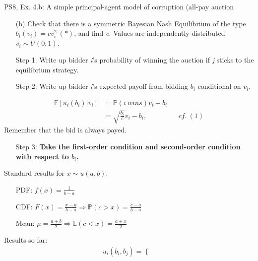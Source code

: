 \begin{frame}{PS8, Ex. 4.b: A simple principal-agent model of corruption (all-pay auction}
    \begin{itemize}
      \item[(b)] Check that there is a symmetric Bayesian Nash Equilibrium of the type $b_i(v_i) = cv_i^2\ (*)$, and find \textit{c}. Values are independently distributed $v_i\sim U(0, 1)$.
    \end{itemize} \vspace{-8pt}
    \begin{multicols}{2}
      \begin{itemize}
        \item[Step 1:] Write up bidder \textit{i}'s probability of winning the auction if \textit{j} sticks to the equilibrium strategy.
        \item[Step 2:] Write up bidder \textit{i}'s expected payoff from bidding $b_i$ conditional on $v_i$.
      \end{itemize} \vspace{-8pt}
      \begin{align*}
        \mathbb{E}[u_i(b_i)|v_i]&=\mathbb{P}(i\ wins)v_i-b_i\\
                           &=\sqrt{\frac{b_i}{c}}v_i-b_i,&&cf.\ (1)
      \end{align*} \vspace{-8pt}
      Remember that the bid is always payed. \vspace{4pt}
      \begin{itemize}
        \item[Step 3:] \textbf{Take the first-order condition and second-order condition with respect to $b_i$.}
      \end{itemize}
      \vfill\null\columnbreak
      Standard results for $x\sim u(a, b):$ \vspace{-6pt}
      \begin{itemize}
        \item[PDF:] $f(x)=\frac{1}{b-a}$
        \item[CDF:] $F(x)=\frac{x-a}{b-a}\Rightarrow\mathbb{P}(c>x)=\frac{c-a}{b-a}$
        \item[Mean:] $\mu=\frac{a+b}{2}\Rightarrow\mathbb{E}(c<x)=\frac{a+x}{2}$
      \end{itemize}
      \vspace{-6pt}
      Results so far: \vspace{-6pt}
      \begin{align*}
        u_i(b_i,b_j)=\left\{\begin{array}{lcl}

\end{array}
\end{align*}
\end{multicols}
\end{frame}
